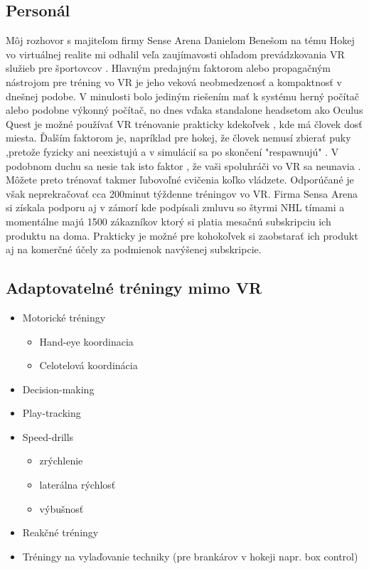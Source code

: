 \documentclass[10pt,twoside,slovak,a4paper]{article}										%
\begin{document}
\subsection{Personál}
Môj rozhovor s majiteľom firmy Sense Arena Danielom Benešom na tému Hokej vo virtuálnej realite mi odhalil veľa zaujímavosti ohľadom prevádzkovania VR služieb pre športovcov . Hlavným predajným faktorom alebo propagačným nástrojom pre tréning vo VR je jeho veková neobmedzenosť a kompaktnosť v dnešnej podobe. V minulosti bolo jediným riešením mať k systému herný počítač alebo podobne výkonný počítač, no dnes vďaka standalone headsetom ako Oculus Quest je možné používať VR trénovanie prakticky kdekoľvek , kde má človek dosť miesta. 
Ďalším faktorom je, napríklad pre hokej, že človek nemusí zbierať puky ,pretože fyzicky ani neexistujú a v simulácií sa po skončení "respawnujú" . V podobnom duchu sa nesie tak isto faktor , že vaši spoluhráči vo VR sa neunavia . Môžete preto trénovať takmer ľubovoľné cvičenia koľko vládzete. Odporúčané je však neprekračovať cca 200minut týždenne tréningov vo VR. Firma Sensa Arena si získala podporu aj v zámorí kde podpísali zmluvu so štyrmi NHL tímami a momentálne majú 1500 zákazníkov ktorý si platia mesačnú subskripciu ich produktu na doma. Prakticky je možné pre kohokoľvek si zaobstarať ich produkt aj na komerčné účely za podmienok navýšenej subskripcie.


\subsection{Adaptovatelné tréningy mimo VR}    		%

\begin{itemize}
\item Motorické tréningy
	\begin{itemize}
	\item Hand-eye koordinacia       
	\item Celotelová koordinácia
	\end{itemize}	
\item Decision-making
\item Play-tracking
\item Speed-drills
	\begin{itemize}
	\item zrýchlenie
	\item laterálna rýchlosť
	\item výbušnosť
	\end{itemize}
\item Reakčné tréningy
\item Tréningy na vylaďovanie techniky (pre brankárov v hokeji napr. box control)
\end{itemize}
\end{document}
